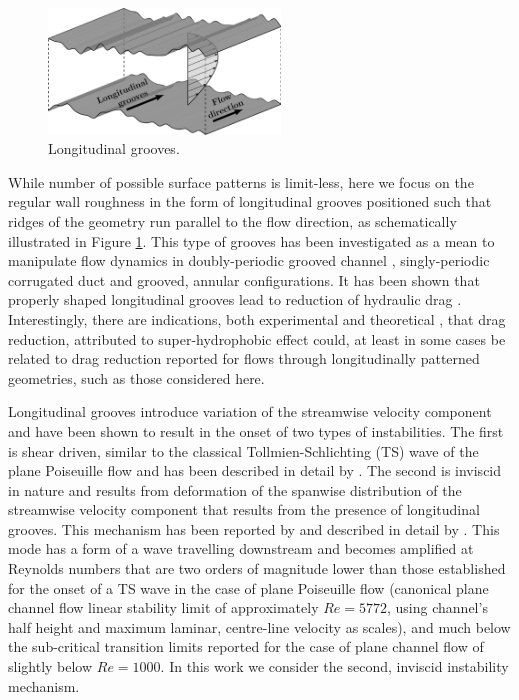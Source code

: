 \documentclass[lineno]{jfm}
\begin{document}

\begin{figure}
\centering
	\includegraphics[width=0.55\textwidth]{long_groove.png}  
	\caption{Longitudinal grooves.}
	\label{fig:longitudinal_groove}
\end{figure}

While number of possible surface patterns is limit-less, here we focus on the 
regular wall roughness in the form of longitudinal grooves positioned such that ridges of the geometry run parallel to the flow direction, as schematically illustrated in Figure \ref{fig:longitudinal_groove}.
This type of grooves has been investigated as a mean to manipulate flow dynamics in doubly-periodic grooved channel \citep{Szumbar2007, mohammadi2014effects, Mohammadi2015, Nikesh2017, Gepner2020, Gepner2020b}, singly-periodic corrugated duct \citep{Nikesh2018, Pushenko2021} and grooved, annular \citep{moradi2019flow, moradi2019drag} configurations.
It has been shown that properly shaped longitudinal grooves lead to reduction of hydraulic drag \citep{Szumbar2011, szumbarski2011impact, mohammadi2015numerical, Ng2018, moradi2019drag}.
Interestingly, there are indications, both experimental \citep{Bolognesi2014,Kim2012} and theoretical \citep{crowdy2017},
that drag reduction, attributed to super-hydrophobic effect could, at least in some cases be related to drag reduction reported for flows through longitudinally patterned geometries, such as those considered here.

Longitudinal grooves introduce variation of the streamwise velocity component and have been shown to result in the onset of two types of instabilities.
The first is shear driven, similar to the classical Tollmien-Schlichting (TS) wave of the plane Poiseuille flow and has been described in detail by \citet{moradi2014stability}.
The second is inviscid in nature and results from deformation of the spanwise distribution of the streamwise velocity component that results from the presence of longitudinal grooves.
This mechanism has been reported by \citet{Szumbar2007} and described in detail by \citet{Mohammadi2015,Nikesh2017}.
This mode has a form of a wave travelling downstream and becomes amplified at Reynolds numbers that are two orders of magnitude lower than those established for the onset of a TS wave in the case of plane Poiseuille flow (canonical plane channel flow linear stability limit of approximately $Re=5772$, using channel's half height and maximum laminar, centre-line velocity as scales), and much below the sub-critical transition limits reported for the case of plane channel flow \citep{carlson1982flow, Gome2020} of slightly below $Re=1000$.
In this work we consider the second, inviscid instability mechanism.
\end{document}

